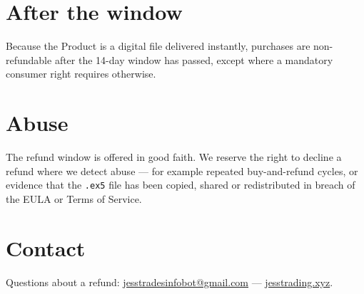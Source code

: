 \documentclass[11pt,a4paper]{article}
\begin{document}
\section{After the window}
Because the Product is a digital file delivered instantly, purchases are non-refundable after the
14-day window has passed, except where a mandatory consumer right requires otherwise.

\section{Abuse}
The refund window is offered in good faith. We reserve the right to decline a refund where we detect
abuse --- for example repeated buy-and-refund cycles, or evidence that the \texttt{.ex5} file has
been copied, shared or redistributed in breach of the EULA or Terms of Service.

\section{Contact}
Questions about a refund:
\href{mailto:jesstradesinfobot@gmail.com}{jesstradesinfobot@gmail.com} ---
\href{https://jesstrading.xyz}{jesstrading.xyz}.
\end{document}
